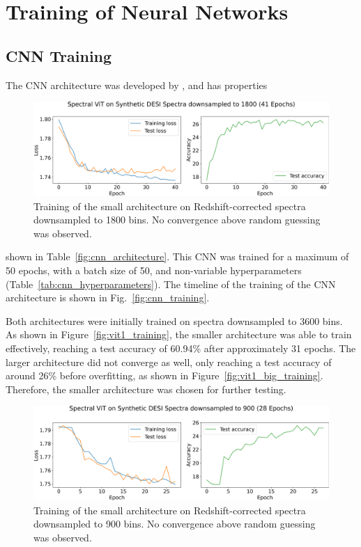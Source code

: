 \section{Training of Neural Networks}
\label{sec:training} 
\subsection{CNN Training}
\label{ssec:cnn_training}
The CNN architecture was developed by \textcite{Sepeku2022}, and has properties 
\begin{figure}[hb!]
    \centering
    \includegraphics[width=.85\linewidth]{figures/vit_model_V1.2training_new.png}
    \caption[Training of Spectral ViT: V1.2]{Training of the small architecture on Redshift-corrected spectra downsampled to 1800 bins. No convergence above random guessing was observed. }
    \label{fig:vit1.2_training}
\end{figure}
shown in Table~\ref{fig:cnn_architecture}.
This CNN was trained for a maximum of 50 epochs, with a batch size of 50, and 
non-variable hyperparameters (Table~\ref{tab:cnn_hyperparameters}). 
The timeline of the training of the CNN architecture is shown in Fig.~\ref{fig:cnn_training}.



Both architectures were initially trained on spectra downsampled to 3600 bins. As shown in Figure~\ref{fig:vit1_training}, 
the smaller architecture was able to train effectively, reaching a test accuracy of 60.94\% after approximately 31 
epochs. The larger architecture did not converge as well, only reaching a test accuracy of around 26\% before 
overfitting, as shown in Figure~\ref{fig:vit1_big_training}. Therefore, the smaller architecture was chosen for further testing.

\begin{figure}[t!]
    \centering
    \includegraphics[width=.85\linewidth]{figures/vit_model_V1.3_muchsmallermodeltraining_new.png}
    \caption[Training of Spectral ViT: V1.3]{Training of the small architecture on Redshift-corrected spectra downsampled to 900 bins. No convergence above random guessing was observed. }
    \label{fig:vit1.3_training}
\end{figure}



